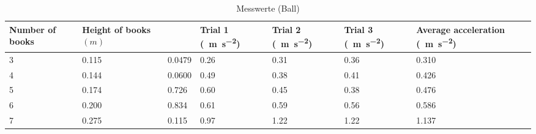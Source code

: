 \documentclass[a4paper, titlepage]{article}
\newcommand{\accunit}[1]{\SI{#1}{\metre\per\square\second}}
\begin{document}
    \begin{table}
        \begin{tabularx}{\textwidth}{|X|X|X|X|X|X|X|}
            \hline
            \textbf{Number of books} & \textbf{Height of books $(m)$} & 
            \boldmath{$\sin{\theta}$} & \textbf{Trial 1}
            (\accunit{}) & 
            \textbf{Trial 2} (\accunit{}) & 
            \textbf{Trial 3} (\accunit{}) & 
            \textbf{Average acceleration} (\accunit{}) \\
            \hline
            3 & 0.115 & 0.0479 & 0.26 & 0.31 & 0.36 & 0.310 \\
            \hline
            4 & 0.144 & 0.0600 & 0.49 & 0.38 & 0.41 & 0.426 \\
            \hline
            5 & 0.174 & 0.726 & 0.60 & 0.45 & 0.38 & 0.476 \\
            \hline
            6 & 0.200 & 0.834 & 0.61 & 0.59 & 0.56 & 0.586 \\
            \hline
            7 & 0.275 & 0.115 & 0.97 & 1.22 & 1.22 & 1.137 \\
            \hline
        \end{tabularx}
        \caption{Messwerte (Ball)}
    \end{table}
\end{document}
